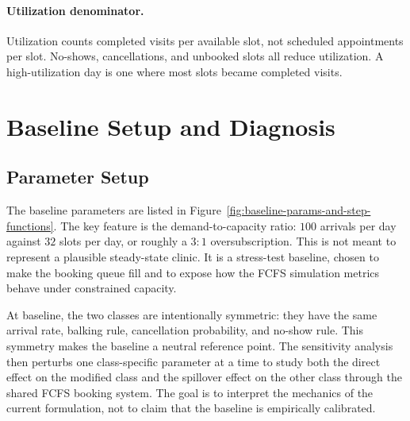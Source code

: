 \documentclass[11pt]{article}
\begin{document}
\paragraph{Utilization denominator.}
Utilization counts completed visits per available slot, not scheduled
appointments per slot. No-shows, cancellations, and unbooked slots all reduce
utilization. A high-utilization day is one where most slots became completed
visits.

\section{Baseline Setup and Diagnosis}
\label{sec:baseline}

\subsection{Parameter Setup}

The baseline parameters are listed in Figure~\ref{fig:baseline-params-and-step-functions}. The key feature is the demand-to-capacity ratio: \(100\) arrivals per day against \(32\) slots per day, or roughly a \(3{:}1\) oversubscription. This is not meant to represent a plausible steady-state clinic. It is a stress-test baseline, chosen to make the booking queue fill and to expose how the FCFS simulation metrics behave under constrained capacity.

At baseline, the two classes are intentionally symmetric: they have the same arrival rate, balking rule, cancellation probability, and no-show rule. This symmetry makes the baseline a neutral reference point. The sensitivity analysis then perturbs one class-specific parameter at a time to study both the direct effect on the modified class and the spillover effect on the other class through the shared FCFS booking system. The goal is to interpret the mechanics of the current formulation, not to claim that the baseline is empirically calibrated.
\end{document}
